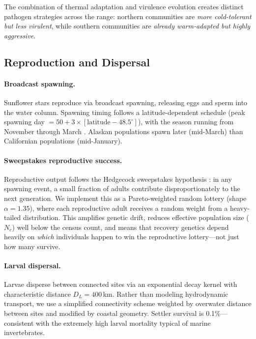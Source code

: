 The combination of thermal adaptation and virulence evolution creates
distinct pathogen strategies across the range: northern communities are
\textit{more cold-tolerant but less virulent}, while southern communities
are \textit{already warm-adapted but highly aggressive}.

\subsection{Reproduction and Dispersal}
\label{sec:reproduction}

\paragraph{Broadcast spawning.}
Sunflower stars reproduce via broadcast spawning, releasing eggs and sperm
into the water column.  Spawning timing follows a latitude-dependent
schedule (peak spawning day $= 50 + 3 \times [\text{latitude} - 48.5^{\circ}]$),
with the season running from November through March \citep{hodin2021}.
Alaskan populations spawn later (mid-March) than Californian populations
(mid-January).

\paragraph{Sweepstakes reproductive success.}
Reproductive output follows the Hedgecock sweepstakes hypothesis
\citep{hedgecock2011}: in any spawning event, a small fraction of adults
contribute disproportionately to the next generation.  We implement this
as a Pareto-weighted random lottery (shape $\alpha = 1.35$), where each
reproductive adult receives a random weight from a heavy-tailed distribution.
This amplifies genetic drift, reduces effective population size ($N_e$)
well below the census count, and means that recovery genetics depend
heavily on \textit{which} individuals happen to win the reproductive
lottery---not just how many survive.

\paragraph{Larval dispersal.}
Larvae disperse between connected sites via an exponential decay kernel
with characteristic distance $D_L = 400$\,km.  Rather than modeling
hydrodynamic transport, we use a simplified connectivity scheme weighted by
overwater distance between sites and modified by coastal geometry.  Settler
survival is 0.1\%---consistent with the extremely high larval mortality
typical of marine invertebrates.

